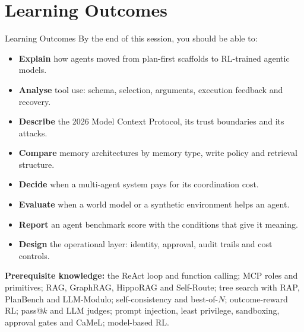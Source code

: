 \section{Learning Outcomes}

\begin{frame}{Learning Outcomes}
    By the end of this session, you should be able to:
    \vspace{0.2em}
    \begin{itemize}\itemsep0.05em
        \item \textbf{Explain} how agents moved from plan-first scaffolds to RL-trained agentic models.
        \item \textbf{Analyse} tool use: schema, selection, arguments, execution feedback and recovery.
        \item \textbf{Describe} the 2026 Model Context Protocol, its trust boundaries and its attacks.
        \item \textbf{Compare} memory architectures by memory type, write policy and retrieval structure.
        \item \textbf{Decide} when a multi-agent system pays for its coordination cost.
        \item \textbf{Evaluate} when a world model or a synthetic environment helps an agent.
        \item \textbf{Report} an agent benchmark score with the conditions that give it meaning.
        \item \textbf{Design} the operational layer: identity, approval, audit trails and cost controls.
    \end{itemize}
    \vspace{0.3em}
    {\footnotesize \textbf{Prerequisite knowledge:} the ReAct loop and function calling; MCP roles and primitives; RAG, GraphRAG, HippoRAG and Self-Route; tree search with RAP, PlanBench and LLM-Modulo; self-consistency and best-of-$N$; outcome-reward RL; pass@$k$ and LLM judges; prompt injection, least privilege, sandboxing, approval gates and CaMeL; model-based RL.\par}
\end{frame}
